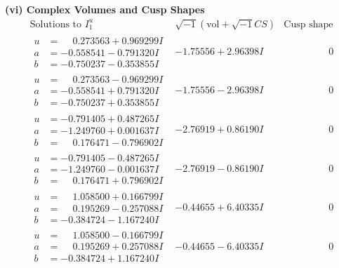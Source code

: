 \documentclass[1p]{elsarticle_modified}
\theoremstyle{definition}
\newcommand{\I}{\sqrt{-1}}
\begin{document}
\newpage\flushleft \textbf{(vi) Complex Volumes and Cusp Shapes}
$$\begin{array}{c|c|c}  
\text{Solutions to }I^u_{1}& \I (\text{vol} + \sqrt{-1}CS) & \text{Cusp shape}\\
 \hline 
\begin{aligned}
u &= \phantom{-}0.273563 + 0.969299 I \\
a &= -0.558541 - 0.791320 I \\
b &= -0.750237 - 0.353855 I\end{aligned}
 & -1.75556 + 2.96398 I & \phantom{-0.000000 } 0 \\ \hline\begin{aligned}
u &= \phantom{-}0.273563 - 0.969299 I \\
a &= -0.558541 + 0.791320 I \\
b &= -0.750237 + 0.353855 I\end{aligned}
 & -1.75556 - 2.96398 I & \phantom{-0.000000 } 0 \\ \hline\begin{aligned}
u &= -0.791405 + 0.487265 I \\
a &= -1.249760 + 0.001637 I \\
b &= \phantom{-}0.176471 - 0.796902 I\end{aligned}
 & -2.76919 + 0.86190 I & \phantom{-0.000000 } 0 \\ \hline\begin{aligned}
u &= -0.791405 - 0.487265 I \\
a &= -1.249760 - 0.001637 I \\
b &= \phantom{-}0.176471 + 0.796902 I\end{aligned}
 & -2.76919 - 0.86190 I & \phantom{-0.000000 } 0 \\ \hline\begin{aligned}
u &= \phantom{-}1.058500 + 0.166799 I \\
a &= \phantom{-}0.195269 - 0.257088 I \\
b &= -0.384724 - 1.167240 I\end{aligned}
 & -0.44655 + 6.40335 I & \phantom{-0.000000 } 0 \\ \hline\begin{aligned}
u &= \phantom{-}1.058500 - 0.166799 I \\
a &= \phantom{-}0.195269 + 0.257088 I \\
b &= -0.384724 + 1.167240 I\end{aligned}
 & -0.44655 - 6.40335 I & \phantom{-0.000000 } 0 \\ \hline\begin{aligned}

\end{aligned}
\end{array}$$
\end{document}
